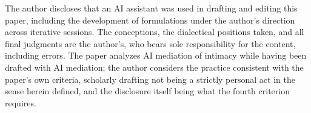 The author discloses that an AI assistant was used in drafting and editing this paper, including the development of formulations under the author's direction across iterative sessions. The conceptions, the dialectical positions taken, and all final judgments are the author's, who bears sole responsibility for the content, including errors. The paper analyzes AI mediation of intimacy while having been drafted with AI mediation; the author considers the practice consistent with the paper's own criteria, scholarly drafting not being a strictly personal act in the sense herein defined, and the disclosure itself being what the fourth criterion requires.
